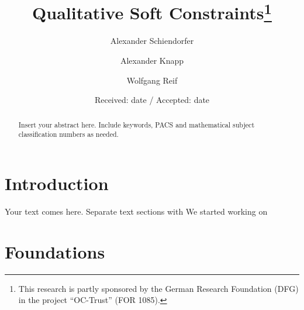 \documentclass[smallcondensed]{svjour3}     %
\begin{document}
\title{Qualitative Soft Constraints\thanks{This research is partly sponsored by the 
German Research Foundation (DFG) in the project ``OC-Trust'' (FOR 1085).}
}


\author{Alexander Schiendorfer \and Alexander Knapp \and Wolfgang Reif %
}



\date{Received: date / Accepted: date}


\maketitle

\begin{abstract}
Insert your abstract here. Include keywords, PACS and mathematical
subject classification numbers as needed.
\end{abstract}

\section{Introduction}
\label{intro}
Your text comes here. Separate text sections with
We started working on \cite{Schiendorfer13}

\section{Foundations}
\end{document}
